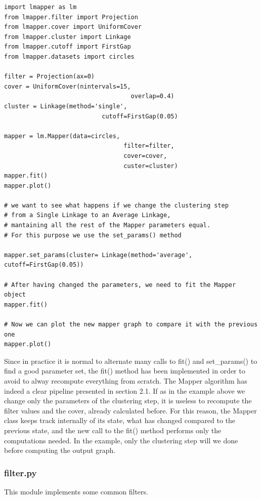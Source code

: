 \begin{lstlisting}[style=mystyle, deletekeywords={filter}]
import lmapper as lm
from lmapper.filter import Projection
from lmapper.cover import UniformCover
from lmapper.cluster import Linkage
from lmapper.cutoff import FirstGap
from lmapper.datasets import circles

filter = Projection(ax=0)
cover = UniformCover(nintervals=15,
								   overlap=0.4)
cluster = Linkage(method='single',
						   cutoff=FirstGap(0.05)

mapper = lm.Mapper(data=circles,
								 filter=filter,
								 cover=cover,
								 custer=cluster)
mapper.fit()
mapper.plot()

# we want to see what happens if we change the clustering step
# from a Single Linkage to an Average Linkage,
# mantaining all the rest of the Mapper parameters equal. 
# For this purpose we use the set_params() method

mapper.set_params(cluster= Linkage(method='average', cutoff=FirstGap(0.05))

# After having changed the parameters, we need to fit the Mapper object
mapper.fit()

# Now we can plot the new mapper graph to compare it with the previous one
mapper.plot()
\end{lstlisting}

Since in practice it is normal to alternate many calls to fit() and set\_params() to find a good parameter set, the fit() method has been implemented in order to avoid to alway recompute everything from scratch. The Mapper algorithm has indeed a clear pipeline presented in section 2.1. If as in the example above we change only the parameters of the clustering step, it is useless to recompute the filter values and the cover, already calculated before. For this reason, the Mapper class keeps track internally of its state, what has changed compared to the previous state, and the new call to the fit() method performs only the computations needed. In the example, only the clustering step will we done before computing the output graph.

\subsubsection{filter.py}
This module implements some common filters.
